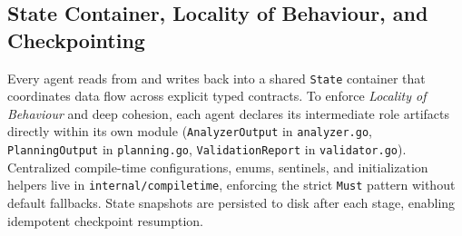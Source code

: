 \subsection{State Container, Locality of Behaviour, and Checkpointing}

Every agent reads from and writes back into a shared
\texttt{State} container that coordinates data flow across explicit
typed contracts. To enforce \emph{Locality of Behaviour} and deep
cohesion, each agent declares its intermediate role artifacts directly
within its own module (\texttt{AnalyzerOutput} in \texttt{analyzer.go},
\texttt{PlanningOutput} in \texttt{planning.go},
\texttt{ValidationReport} in \texttt{validator.go}). Centralized
compile-time configurations, enums, sentinels, and initialization
helpers live in \texttt{internal/compiletime}, enforcing the strict
\texttt{Must} pattern without default fallbacks. State snapshots are
persisted to disk after each stage, enabling idempotent checkpoint resumption.
